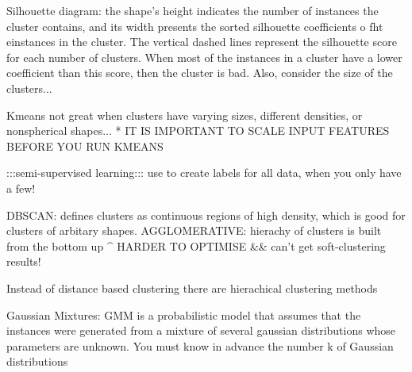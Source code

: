 Silhouette diagram:
the shape's height indicates the number of instances
the cluster contains, and its width presents the sorted silhouette coefficients o fht einstances in the cluster.
The vertical dashed lines represent the silhouette score for each number of clusters.
When most of the instances in a cluster have a lower coefficient than this score,
then the cluster is bad.
Also, consider the size of the clusters...

Kmeans not great when clusters have varying sizes,
different densities,
or nonspherical shapes...
* IT IS IMPORTANT TO SCALE INPUT FEATURES BEFORE YOU RUN KMEANS

:::semi-supervised learning:::
use to create labels for all data, when you only have a few!

DBSCAN: defines clusters as continuous regions of high density, which is good for clusters of arbitary shapes.
AGGLOMERATIVE: hierachy of clusters is built from the bottom up
^ HARDER TO OPTIMISE
&& can't get soft-clustering results!

Instead of distance based clustering
there are hierachical clustering methods


Gaussian Mixtures:
GMM is a probabilistic model that assumes that the instances were generated from a mixture of several gaussian distributions
whose parameters are unknown.
You must know in advance the number k of Gaussian distributions

